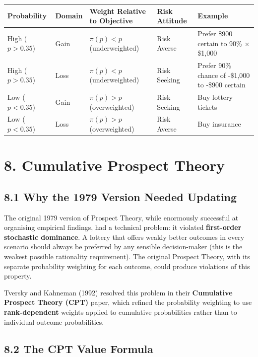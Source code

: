 \documentclass[12pt, letterpaper]{article}
\begin{document}
\begin{table}[H]
\centering
\small
\begin{tabularx}{\linewidth}{lYYYY}
\toprule
Probability & Domain & Weight Relative to Objective & Risk Attitude & Example \\
\midrule
High ($p > 0.35$) & Gain & $\pi(p) < p$ (underweighted) & Risk Averse & Prefer \$900 certain to 90\% $\times$ \$1,000 \\
High ($p > 0.35$) & Loss & $\pi(p) < p$ (underweighted) & Risk Seeking & Prefer 90\% chance of -\$1,000 to -\$900 certain \\
Low ($p < 0.35$) & Gain & $\pi(p) > p$ (overweighted) & Risk Seeking & Buy lottery tickets \\
Low ($p < 0.35$) & Loss & $\pi(p) > p$ (overweighted) & Risk Averse & Buy insurance \\
\bottomrule
\end{tabularx}
\end{table}


\medskip


\section{8. Cumulative Prospect Theory}



\subsection{8.1 Why the 1979 Version Needed Updating}


The original 1979 version of Prospect Theory, while enormously successful at organising empirical findings, had a technical problem: it violated \textbf{first-order stochastic dominance}. A lottery that offers weakly better outcomes in every scenario should always be preferred by any sensible decision-maker (this is the weakest possible rationality requirement). The original Prospect Theory, with its separate probability weighting for each outcome, could produce violations of this property.

Tversky and Kahneman (1992) resolved this problem in their \textbf{Cumulative Prospect Theory (CPT)} paper, which refined the probability weighting to use \textbf{rank-dependent} weights applied to cumulative probabilities rather than to individual outcome probabilities.


\subsection{8.2 The CPT Value Formula}
\end{document}
